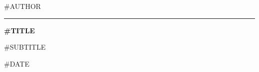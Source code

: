 \thispagestyle{empty}

\begin{titlepage}
  \selectfont
  \begin{flushright}\LARGE
	#AUTHOR
  \end{flushright}
  \hrule
  \begin{flushleft}\huge\bfseries
	#TITLE
  \end{flushleft}


  \begin{center}\LARGE
    #SUBTITLE
  \end{center}


  \begin{center}
    #DATE
  \end{center}
\end{titlepage}
